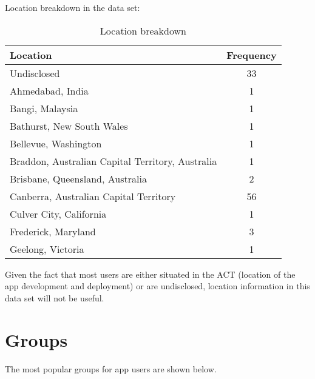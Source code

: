 Location breakdown in the data set:

\begin{table}[!htbp]
\centering
	\begin{tabular}{|l|c|} %
		\hline
		\textbf{Location} & \textbf{Frequency}  \\ \hline
		Undisclosed & 33 \\ \hline
		Ahmedabad, India & 1 \\ \hline
		Bangi, Malaysia & 1 \\ \hline
		Bathurst, New South Wales & 1 \\ \hline
		Bellevue, Washington & 1 \\ \hline
		Braddon, Australian Capital Territory, Australia & 1 \\ \hline
		Brisbane, Queensland, Australia & 2 \\ \hline
		Canberra, Australian Capital Territory & 56 \\ \hline
		Culver City, California & 1 \\ \hline
		Frederick, Maryland & 3 \\ \hline
		Geelong, Victoria & 1 \\ \hline
	\end{tabular}
	\caption{Location breakdown}
	\label{tab:revpol}
\end{table}

Given the fact that most users are either situated in the ACT (location of the app development and deployment) or are undisclosed, location information 
in this data set will not be useful.

\clearpage

\section{Groups}
\label{sec:groups}

The most popular groups for app users are shown below.

